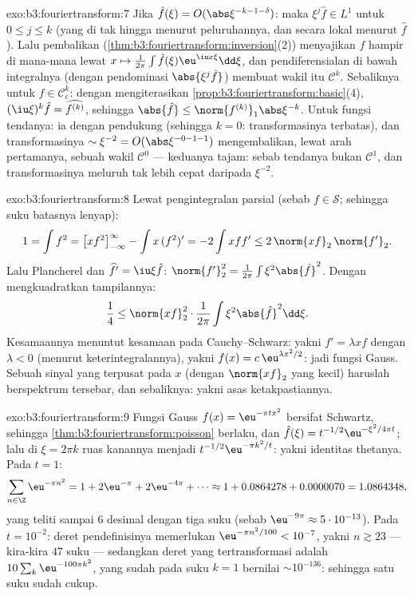 \begin{solution}{exo:b3:fouriertransform:7}
Jika $\hat f(\xi) = O(\abs\xi^{-k-1-\delta})$: maka $\xi^j\hat f
\in L^1$ untuk $0 \leq j \leq k$ (yang  di tak hingga menurut
peluruhannya, dan secara lokal menurut  $\hat f$). Lalu pembalikan
(\cref{thm:b3:fouriertransform:inversion}(2)) menyajikan $f$
hampir di mana-mana lewat $x \mapsto \frac1{2\pi}\int\hat f(\xi)\eu^{\iu
x\xi}\dd\xi$, dan pendiferensialan di bawah integralnya
(dengan pendominasi $\abs{\xi^j\hat f}$) membuat wakil itu
$\mathcal C^k$. Sebaliknya untuk $f \in \mathcal C_c^k$:
dengan mengiterasikan \cref{prop:b3:fouriertransform:basic}(4),
$(\iu\xi)^k\hat f = \widehat{f^{(k)}}$, sehingga $\abs{\hat f} \leq
\norm{f^{(k)}}_1\abs\xi^{-k}$. Untuk fungsi tendanya: ia  dengan
pendukung  (sehingga $k = 0$: transformasinya terbatas), dan
transformasinya $\sim \xi^{-2} = O(\abs\xi^{-0-1-1})$ mengembalikan, lewat
arah pertamanya, sebuah wakil $\mathcal C^0$ --- keduanya
tajam: sebab tendanya bukan $\mathcal C^1$, dan transformasinya
meluruh tak lebih cepat daripada $\xi^{-2}$.
\end{solution}

\begin{solution}{exo:b3:fouriertransform:8}
Lewat pengintegralan parsial (sebab $f \in \mathcal S$; sehingga suku batasnya
lenyap):
\[
1 = \int f^2 = \bigl[xf^2\bigr]_{-\infty}^{\infty} - \int
x\,(f^2)' = -2\int xff' \leq 2\,\norm{xf}_2\,\norm{f'}_2 .
\]
Lalu Plancherel dan $\widehat{f'} = \iu\xi\hat f$:
$\norm{f'}_2^2 = \frac1{2\pi}\int\xi^2\abs{\hat f}^2$. Dengan mengkuadratkan
tampilannya:
\[
\frac14 \leq \norm{xf}_2^2\cdot\frac1{2\pi}
\int\xi^2\abs{\hat f}^2\dd\xi .
\]
Kesamaannya menuntut kesamaan pada Cauchy--Schwarz: yakni $f' =
\lambda xf$ dengan $\lambda < 0$ (menurut keterintegralannya), yakni $f(x) =
c\,\eu^{\lambda x^2/2}$: jadi fungsi Gauss. Sebuah sinyal yang terpusat pada
$x$ (dengan $\norm{xf}_2$ yang kecil) haruslah berspektrum tersebar,
dan sebaliknya: yakni asas ketakpastiannya.
\end{solution}

\begin{solution}{exo:b3:fouriertransform:9}
Fungsi Gauss $f(x) = \eu^{-\pi tx^2}$ bersifat Schwartz, sehingga
\cref{thm:b3:fouriertransform:poisson} berlaku, dan
$\hat f(\xi) = t^{-1/2}\eu^{-\xi^2/4\pi t}$; lalu di $\xi = 2\pi
k$ ruas kanannya menjadi $t^{-1/2}\eu^{-\pi k^2/t}$: yakni
identitas thetanya. Pada $t = 1$:
\[
\sum_{n\in\Z}\eu^{-\pi n^2} = 1 + 2\eu^{-\pi} + 2\eu^{-4\pi} +
\cdots \approx 1 + 0.0864278 + 0.0000070 = 1.0864348,
\]
yang teliti sampai $6$ desimal dengan tiga suku (sebab $\eu^{-9\pi}
\approx 5\cdot10^{-13}$). Pada $t = 10^{-2}$: deret
pendefinisinya memerlukan $\eu^{-\pi n^2/100} < 10^{-7}$, yakni $n \gtrsim
23$ --- kira-kira $47$ suku --- sedangkan deret yang tertransformasi adalah
$10\sum_k\eu^{-100\pi k^2}$, yang sudah pada suku $k = 1$ bernilai
$\sim 10^{-136}$: sehingga satu suku sudah cukup.
\end{solution}

